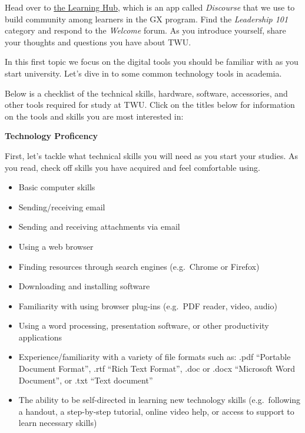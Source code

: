 \documentclass[
]{book}
\providecommand{\tightlist}{%
  \setlength{\itemsep}{0pt}\setlength{\parskip}{0pt}}
\theoremstyle{definition}
\theoremstyle{definition}
\theoremstyle{definition}
\theoremstyle{definition}
\theoremstyle{remark}
\begin{document}
\begin{reflect}
Head over to \href{https://twu.discourse.group}{the Learning Hub}, which is an app called \emph{Discourse} that we use to build community among learners in the GX program. Find the \emph{Leadership 101} category and respond to the \emph{Welcome} forum. As you introduce yourself, share your thoughts and questions you have about TWU.
\end{reflect}

In this first topic we focus on the digital tools you should be familiar with as you start university. Let's dive in to some common technology tools in academia.

Below is a checklist of the technical skills, hardware, software, accessories, and other tools required for study at TWU. Click on the titles below for information on the tools and skills you are most interested in:

\textbf{Technology Proficency}

First, let's tackle what technical skills you will need as you start your studies. As you read, check off skills you have acquired and feel comfortable using.

\begin{itemize}
\tightlist
\item
  Basic computer skills\\
\item
  Sending/receiving email
\item
  Sending and receiving attachments via email
\item
  Using a web browser
\item
  Finding resources through search engines (e.g.~Chrome or Firefox)
\item
  Downloading and installing software
\item
  Familiarity with using browser plug-ins (e.g.~PDF reader, video, audio)
\item
  Using a word processing, presentation software, or other productivity applications
\item
  Experience/familiarity with a variety of file formats such as: .pdf ``Portable Document Format'', .rtf ``Rich Text Format'', .doc or .docx ``Microsoft Word Document'', or .txt ``Text document''
\item
  The ability to be self-directed in learning new technology skills (e.g.~following a handout, a step-by-step tutorial, online video help, or access to support to learn necessary skills)
\end{itemize}
\end{document}
